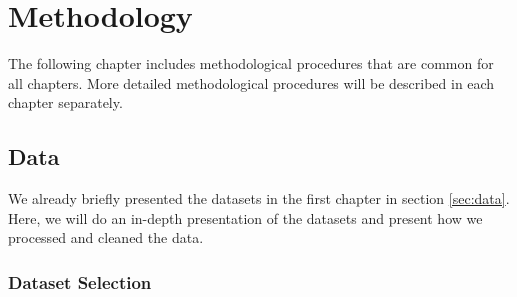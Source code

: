 
\chapter{Methodology} %
\label{chapter3} 

The following chapter includes methodological procedures that are common for all chapters.
More detailed methodological procedures will be described in each chapter separately. 

\section{Data}

We already briefly presented the datasets in the first chapter in section \ref{sec:data}.
Here, we will do an in-depth presentation of the datasets and present how we processed and cleaned the data. 

\subsection{Dataset Selection}

